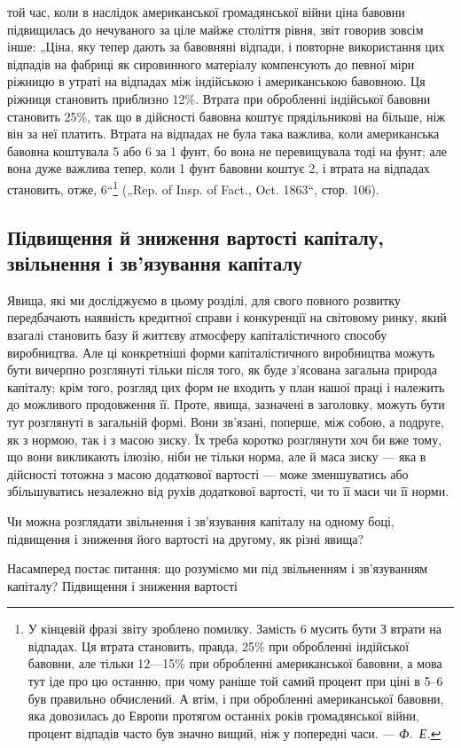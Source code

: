 \parcont{}  %
той час, коли в наслідок американської громадянської війни ціна
бавовни підвищилась до нечуваного за ціле майже століття
рівня, звіт говорив зовсім інше: „Ціна, яку тепер дають за бавовняні
відпади, і повторне використання цих відпадів на
фабриці як сировинного матеріалу компенсують до певної міри
ріжницю в утраті на відпадах між індійською і американською
бавовною. Ця ріжниця становить приблизно 12\%. Втрата при
обробленні індійської бавовни становить 25\%, так що в дійсності
бавовна коштує прядільникові на  більше, ніж він за неї
платить. Втрата на відпадах не була така важлива, коли американська
бавовна коштувала 5 або 6 за 1 фунт, бо вона
не перевищувала тоді  на фунт; але вона дуже важлива
тепер, коли 1 фунт бавовни коштує 2, і втрата на відпадах
становить, отже, 6“\footnote{
У кінцевій фразі звіту зроблено помилку. Замість 6 мусить бути З
втрати на відпадах. Ця втрата становить, правда, 25\% при обробленні
індійської бавовни, але тільки 12—15\% при обробленні американської бавовни,
а мова тут іде про цю останню, при чому раніше той самий процент при
ціні в 5--6 був правильно обчислений. А втім, і при обробленні американської
бавовни, яка довозилась до Европи протягом останніх років громадянської
війни, процент відпадів часто був значно вищий, ніж у попередні
часи. — \emph{Ф.~Е.}
} („Rep. of Insp. of Fact., Oct.
1863“, стор. 106).

\subsection{Підвищення й зниження вартості капіталу, звільнення
і зв’язування капіталу}

Явища, які ми досліджуємо в цьому розділі, для свого повного
розвитку передбачають наявність кредитної справи і конкуренції
на світовому ринку, який взагалі становить базу й життєву атмосферу
капіталістичного способу виробництва. Але ці конкретніші
форми капіталістичного виробництва можуть бути вичерпно розглянуті
тільки після того, як буде з’ясована загальна природа
капіталу; крім того, розгляд цих форм не входить у план нашої
праці і належить до можливого продовження її. Проте, явища,
зазначені в заголовку, можуть бути тут розглянуті в загальній
формі. Вони зв’язані, поперше, між собою, а подруге, як
з нормою, так і з масою зиску. Їх треба коротко розглянути
хоч би вже тому, що вони викликають ілюзію, ніби не тільки
норма, але й маса зиску — яка в дійсності тотожна з масою
додаткової вартості — може зменшуватись або збільшуватись
незалежно від рухів додаткової вартості, чи то її маси чи її
норми.

Чи можна розглядати звільнення і зв’язування капіталу на
одному боці, підвищення і зниження його вартості на другому,
як різні явища?

Насамперед постає питання: що розуміємо ми під звільненням
і зв’язуванням капіталу? Підвищення і зниження вартості
\parbreak{}  %
